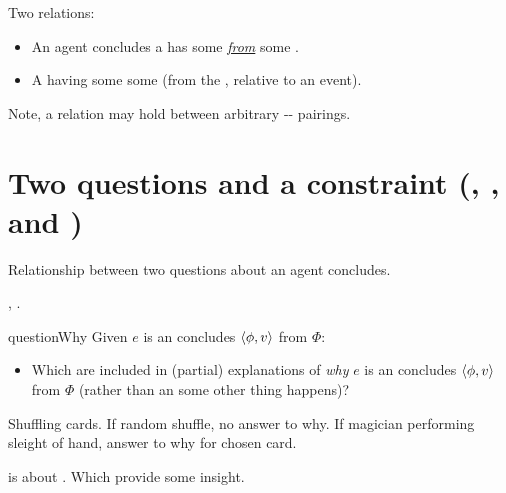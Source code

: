 \documentclass[10pt]{article}
\begin{document}
\begin{note}
  \noindent
  Two relations:

  \begin{itemize}
  \item
    An agent concludes a  has some  \underline{\emph{from}} some \pool{}.
  \item
    A  having some  \underline{\emph{\fof{}}} some \pool{} (from the \agpe{}, relative to an event).
  \end{itemize}

  Note, a \fof{} relation may hold between arbitrary -- pairings.
\end{note}

\newpage

\section{Two questions and a constraint \hfill (\qWhy{}, \qHow{}, and \issueInclusion{})}
\label{sec:target}


\begin{note}
  Relationship between two questions about  an agent concludes.

  \qWhy{} \qHow{}, \issueInclusion{}.
\end{note}

\begin{note}
  \begin{question}{questionWhy}{\qWhy{}}
    Given \(e\) is an  \vAgent{} concludes \(\langle\phi, v\rangle\) from \(\Phi\):
    \begin{itemize}
    \item
      Which  are included in (partial) explanations of \emph{why} \(e\) is an  \vAgent{} concludes \(\langle\phi, v\rangle\) from \(\Phi\) (rather than an  some other thing happens)?
    \end{itemize}
    \vspace{-1\baselineskip}
  \end{question}

  Shuffling cards.
  If random shuffle, no answer to why.
  If magician performing sleight of hand, answer to why for chosen card.

  \qWhy{} is about \fingfr{}.
  Which \fingfr{} provide some insight.
\end{note}
\end{document}
